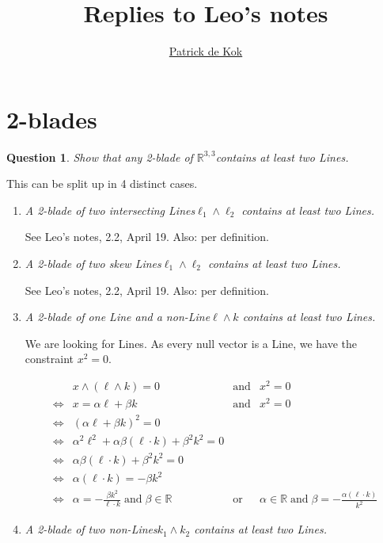 \documentclass[a4paper,11pt,twoside,openright]{article}
\title{Replies to Leo's notes}
\author{\href{mailto:pkok@science.uva.nl}{Patrick de Kok}}
\newcommand{\textgt}[1]{\textsf{#1}\xspace}
\newcommand{\pLine}{\textgt{Line}}
\newcommand{\pLines}{\textgt{Lines}}
\newcommand{\Rl}{\ensuremath{\mathbb{R}^{3,3}}}
\newcommand{\en}{\ensuremath{\mathbin{\mbox{and}}}}
\newcommand{\of}{\ensuremath{\mathbin{\mbox{or}}}}
\newcommand{\eql}{\ensuremath{\Leftrightarrow}}
\newtheorem{question}{Question}
\begin{document}
\maketitle

\section{2-blades}
\begin{question} 
Show that \emph{any} 2-blade of \Rl contains at least two \pLines.
\end{question}

This can be split up in 4 distinct cases.

\begin{enumerate}
\item \emph{A 2-blade of two intersecting \pLines $\ell_1 \wedge \ell_2$ contains at least two \pLines.}

See Leo's notes, 2.2, April 19.  Also: per definition.

\item \emph{A 2-blade of two skew \pLines $\ell_1 \wedge \ell_2$ contains at least two \pLines.}

See Leo's notes, 2.2, April 19.  Also: per definition.

\item \emph{A 2-blade of one \pLine and a non-\pLine $\ell \wedge k$ contains at least two \pLines.}

We are looking for \pLines.  As every null vector is a \pLine, we have the constraint $x^2 = 0$.

\[
\begin{array}{rlcl}
 & x \wedge (\ell \wedge k) = 0 &\en& x^2 = 0 \\
\eql& x = \alpha \ell + \beta k &\en& x^2 = 0 \\
\eql& (\alpha \ell + \beta k)^2 = 0 \\
\eql& \alpha^2 \ell^2 + \alpha \beta \left(\ell \cdot k\right) + \beta^2 k^2 = 0 \\
\eql& \alpha \beta \left(\ell \cdot k\right) + \beta^2 k^2 = 0 \\
\eql& \alpha \left(\ell \cdot k\right) = -\beta k^2 \\
\eql& \alpha = -\frac{\beta k^2}{\ell \cdot k} \en \beta \in \mathbb{R} &\of& \alpha \in \mathbb{R} \en \beta = -\frac{\alpha\left(\ell \cdot k\right)}{k^2}
\end{array}
\]

\item \emph{A 2-blade of two non-\pLines $k_1 \wedge k_2$ contains at least two \pLines.}


\end{enumerate}
\end{document}
